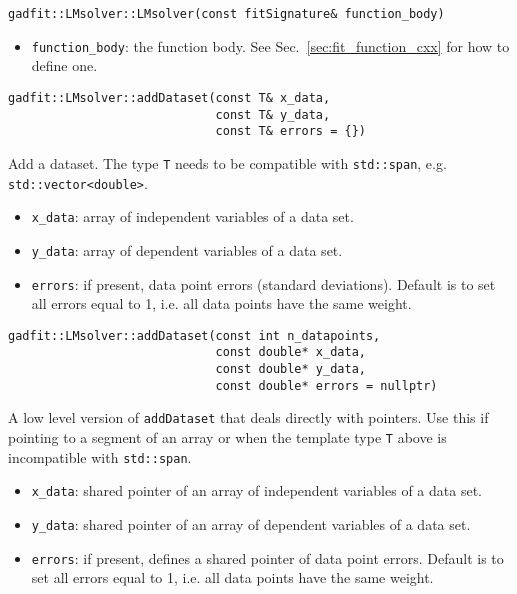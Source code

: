 \documentclass{article}
\begin{document}
\begin{verbatim}
gadfit::LMsolver::LMsolver(const fitSignature& function_body)
\end{verbatim}
\begin{itemize}
\item \verb+function_body+: the function body. See Sec.~\ref{sec:fit_function_cxx} for how to define one.
\end{itemize}

\begin{verbatim}
gadfit::LMsolver::addDataset(const T& x_data,
                             const T& y_data,
                             const T& errors = {})
\end{verbatim}
Add a dataset. The type \texttt{T} needs to be compatible with \texttt{std::span}, e.g. \texttt{std::vector<double>}.
\begin{itemize}
\item \verb+x_data+: array of independent variables of a data set.
\item \verb+y_data+: array of dependent variables of a data set.
\item \verb+errors+: if present, data point errors (standard deviations). Default is to set all errors equal to 1, i.e. all data points have the same weight.
\end{itemize}

\begin{verbatim}
gadfit::LMsolver::addDataset(const int n_datapoints,
                             const double* x_data,
                             const double* y_data,
                             const double* errors = nullptr)
\end{verbatim}
A low level version of \texttt{addDataset} that deals directly with pointers. Use this if pointing to a segment of an array or when the template type \texttt{T} above is incompatible with \texttt{std::span}.
\begin{itemize}
\item \verb+x_data+: shared pointer of an array of independent variables of a data set.
\item \verb+y_data+: shared pointer of an array of dependent variables of a data set.
\item \verb+errors+: if present, defines a shared pointer of data point errors. Default is to set all errors equal to 1, i.e. all data points have the same weight.
\end{itemize}
\end{document}
